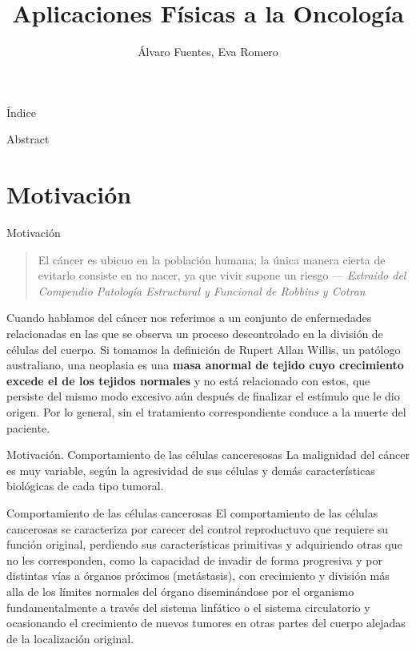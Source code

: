 \documentclass{beamer}
\title[Aplicaciones Físicas a la Oncología]{Aplicaciones Físicas a la Oncología}
\author[Fuentes,Romero]{Álvaro Fuentes, Eva Romero}
\institute[UCO]{Universidad de Córdoba}
\begin{document}
\begin{frame}
    \titlepage
\end{frame}

\begin{frame}{Índice}
    \tableofcontents
\end{frame}
\begin{frame}{Abstract}
    
\end{frame}
\section{Motivación}
\begin{frame}{Motivación}
\begin{center}
   \begin{quote}
    El cáncer es ubicuo en la población humana; la única manera cierta de evitarlo consiste en no nacer, ya que vivir supone un riesgo
    --- \textit{Extraido del Compendio Patología Estructural y Funcional de Robbins y Cotran}
\end{quote} 
\end{center}

Cuando hablamos del cáncer nos referimos a un conjunto de enfermedades relacionadas en las que se observa un proceso descontrolado en la división de células del cuerpo. Si tomamos la definición de Rupert Allan Willis, un patólogo australiano, una neoplasia es una \textbf{masa anormal de tejido cuyo crecimiento excede el de los tejidos normales} y no está relacionado con estos, que persiste del mismo modo excesivo aún después de finalizar el estímulo que le dio origen. Por lo general, sin el tratamiento correspondiente conduce a la muerte del paciente.
\end{frame}

\begin{frame}{Motivación. Comportamiento de las células canceresosas } La malignidad del cáncer es muy variable, según la agresividad de sus células y demás características biológicas de cada tipo tumoral.  

\begin{block}{Comportamiento de las células cancerosas}
    El comportamiento de las células cancerosas se caracteriza por carecer del control reproductuvo que requiere su función original, perdiendo sus características primitivas y adquiriendo otras que no les corresponden, como la capacidad de invadir de forma progresiva y por distintas vías a órganos próximos (metástasis), con crecimiento y división más alla de los límites normales del órgano diseminándose por el organismo fundamentalmente a través del sistema linfático o el sistema circulatorio y ocasionando el crecimiento de nuevos tumores en otras partes del cuerpo alejadas de la localización original.  
\end{block}
\end{frame}
\end{document}
